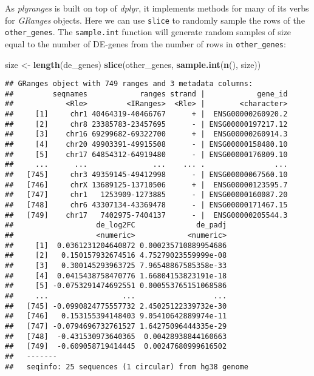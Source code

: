 \documentclass[
]{article}
\newenvironment{Shaded}{}{}
\newcommand{\KeywordTok}[1]{\textcolor[rgb]{0.00,0.44,0.13}{\textbf{#1}}}
\newcommand{\NormalTok}[1]{#1}
\newcommand{\StringTok}[1]{\textcolor[rgb]{0.25,0.44,0.63}{#1}}
\begin{document}
As \emph{plyranges} is built on top of \emph{dplyr}, it implements methods for many of
its verbs for \emph{GRanges} objects. Here we can use \texttt{slice} to randomly sample
the rows of the \texttt{other\_genes}. The \texttt{sample.int} function will generate random
samples of size equal to the number of DE-genes from the number of rows in
\texttt{other\_genes}:

\begin{Shaded}
\begin{Highlighting}[]
\NormalTok{size <-}\StringTok{ }\KeywordTok{length}\NormalTok{(de_genes)}
\KeywordTok{slice}\NormalTok{(other_genes, }\KeywordTok{sample.int}\NormalTok{(}\KeywordTok{n}\NormalTok{(), size))}
\end{Highlighting}
\end{Shaded}

\begin{verbatim}
## GRanges object with 749 ranges and 3 metadata columns:
##         seqnames            ranges strand |            gene_id
##            <Rle>         <IRanges>  <Rle> |        <character>
##     [1]     chr1 40464319-40466767      + |  ENSG00000260920.2
##     [2]     chr8 23385783-23457695      - | ENSG00000197217.12
##     [3]    chr16 69299682-69322700      + |  ENSG00000260914.3
##     [4]    chr20 49903391-49915508      - | ENSG00000158480.10
##     [5]    chr17 64854312-64919480      - | ENSG00000176809.10
##     ...      ...               ...    ... .                ...
##   [745]     chr3 49359145-49412998      - | ENSG00000067560.10
##   [746]     chrX 13689125-13710506      + |  ENSG00000123595.7
##   [747]     chr1   1253909-1273885      - | ENSG00000160087.20
##   [748]     chr6 43307134-43369478      - | ENSG00000171467.15
##   [749]    chr17   7402975-7404137      - |  ENSG00000205544.3
##                   de_log2FC              de_padj
##                   <numeric>            <numeric>
##     [1]  0.0361231204640872 0.000235710889954686
##     [2]   0.150157932674516 4.75279023559999e-08
##     [3]   0.300145293963725 7.96548867585358e-33
##     [4]  0.0415438758470776 1.66804153823191e-18
##     [5] -0.0753291474692551 0.000553765151068586
##     ...                 ...                  ...
##   [745] -0.0990824775557732 2.45025122339732e-30
##   [746]   0.153155394148403 9.05410642889974e-11
##   [747] -0.0794696732761527 1.64275096444335e-29
##   [748]  -0.431530973640365  0.00428938844160663
##   [749]  -0.609058719414445  0.00247680999616502
##   -------
##   seqinfo: 25 sequences (1 circular) from hg38 genome
\end{verbatim}
\end{document}
